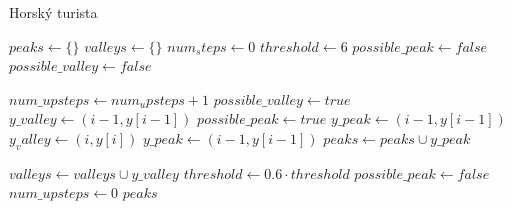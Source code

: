\begin{algorithm}
\caption{Horský turista}
\begin{algorithmic}[1]
	\State $peaks \gets \{\}$ 	
	\State $valleys \gets \{\}$ 	
	\State $num_steps \gets 0$ 
	\State $threshold \gets 6$
	\State $possible\_peak \gets false$ 
	\State $possible\_valley \gets false$  
	
			\State $num\_upsteps \gets num_upsteps + 1$		
				\State $possible\_valley \gets true$			
				\State $y\_valley \gets (i - 1, y[i-1])$
			\EndIf
		\Else
				\State $possible\_peak \gets true$				
				\State $y\_peak \gets (i - 1, y[i-1])$
			\Else
					\State $y_valley \gets (i, y[i])$
				\EndIf
						\State $y\_peak \gets (i - 1, y[i-1])$
					\Else
						\State $peaks \gets peaks \cup y\_peak$
					\EndIf
		
						\State $valleys \gets valleys \cup y\_valley$
					\EndIf
					\State $threshold \gets 0.6 \cdot threshold$
					\State $possible\_peak \gets false$
				\EndIf
			\EndIf
			\State $num\_upsteps \gets 0$
		\EndIf
	\EndFor
	\State \Return $peaks$
\EndFunction
\end{algorithmic}
\end{algorithm}

